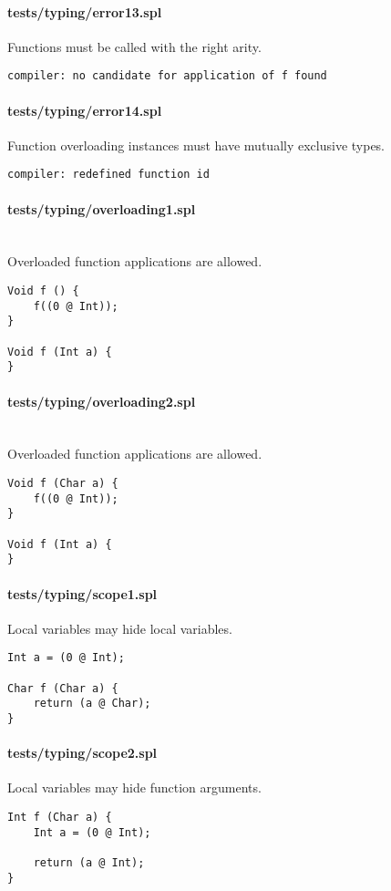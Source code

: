 \documentclass[a4paper]{article}
\begin{document}
\paragraph{tests/typing/error13.spl}
Functions must be called with the right arity.
    \begin{verbatim}
compiler: no candidate for application of f found\end{verbatim}

\paragraph{tests/typing/error14.spl}
Function overloading instances must have mutually exclusive types.
    \begin{verbatim}
compiler: redefined function id\end{verbatim}

\paragraph{tests/typing/overloading1.spl}\mbox{}\\ %
Overloaded function applications are allowed.
    \begin{verbatim}
Void f () {
    f((0 @ Int));
}

Void f (Int a) {
}\end{verbatim}

\paragraph{tests/typing/overloading2.spl}\mbox{}\\ %
Overloaded function applications are allowed.
    \begin{verbatim}
Void f (Char a) {
    f((0 @ Int));
}

Void f (Int a) {
}\end{verbatim}

\paragraph{tests/typing/scope1.spl}
Local variables may hide local variables.
    \begin{verbatim}
Int a = (0 @ Int);

Char f (Char a) {
    return (a @ Char);
}\end{verbatim}

\paragraph{tests/typing/scope2.spl}
Local variables may hide function arguments.
    \begin{verbatim}
Int f (Char a) {
    Int a = (0 @ Int);

    return (a @ Int);
}\end{verbatim}
\end{document}
